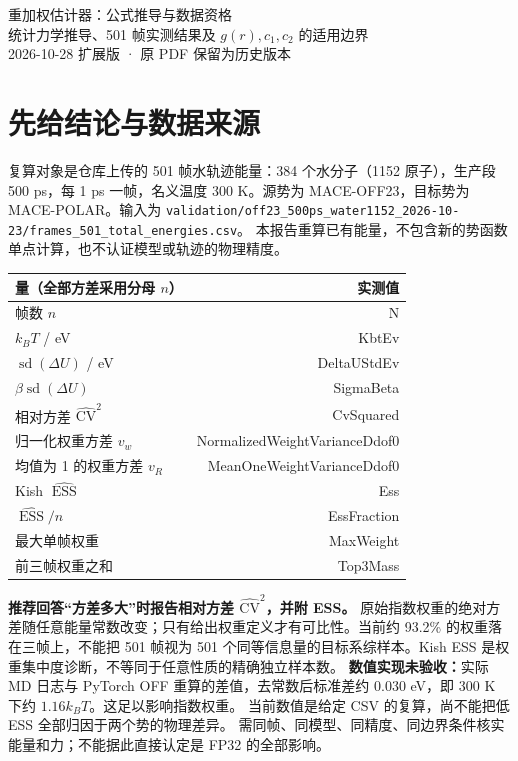 \documentclass[11pt,a4paper]{article}
\newcommand{\ESS}{\operatorname{ESS}}
\begin{document}
\begin{center}{\LARGE 重加权估计器：公式推导与数据资格}\\[8pt]
{\large 统计力学推导、501 帧实测结果及 $g(r),c_1,c_2$ 的适用边界}\\[6pt]
2026-10-28 扩展版 · 原 PDF 保留为历史版本\end{center}
\section{先给结论与数据来源}
复算对象是仓库上传的 501 帧水轨迹能量：384 个水分子（1152 原子），生产段 500 ps，每 1 ps 一帧，名义温度 300 K。源势为 MACE-OFF23，目标势为 MACE-POLAR。输入为
\texttt{validation/off23\_500ps\_water1152\_2026-10-23/frames\_501\_total\_energies.csv}。
本报告重算已有能量，不包含新的势函数单点计算，也不认证模型或轨迹的物理精度。

\begin{center}\begin{tabular}{lr}\toprule
量（全部方差采用分母 $n$） & 实测值\\\midrule
帧数 $n$ & \csname N\endcsname\\
$k_BT$ / eV & \csname KbtEv\endcsname\\
$\operatorname{sd}(\Delta U)$ / eV & \csname DeltaUStdEv\endcsname\\
$\beta\operatorname{sd}(\Delta U)$ & \csname SigmaBeta\endcsname\\
相对方差 $\widehat{\mathrm{CV}}^2$ & \csname CvSquared\endcsname\\
归一化权重方差 $v_w$ & \csname NormalizedWeightVarianceDdof0\endcsname\\
均值为 1 的权重方差 $v_R$ & \csname MeanOneWeightVarianceDdof0\endcsname\\
Kish $\widehat{\ESS}$ & \csname Ess\endcsname\\
$\widehat{\ESS}/n$ & \csname EssFraction\endcsname\\
最大单帧权重 & \csname MaxWeight\endcsname\\
前三帧权重之和 & \csname Top3Mass\endcsname\\\bottomrule
\end{tabular}\end{center}
\textbf{推荐回答“方差多大”时报告相对方差 $\widehat{\mathrm{CV}}^2$，并附 ESS。}
原始指数权重的绝对方差随任意能量常数改变；只有给出权重定义才有可比性。当前约 93.2\% 的权重落在三帧上，不能把 501 帧视为 501 个同等信息量的目标系综样本。Kish ESS 是权重集中度诊断，不等同于任意性质的精确独立样本数。
\textbf{数值实现未验收：}实际 MD 日志与 PyTorch OFF 重算的差值，去常数后标准差约
0.030 eV，即 300 K 下约 $1.16k_BT$。这足以影响指数权重。
当前数值是给定 CSV 的复算，尚不能把低 ESS 全部归因于两个势的物理差异。
需同帧、同模型、同精度、同边界条件核实能量和力；不能据此直接认定是 FP32 的全部影响。
\newpage
\end{document}
